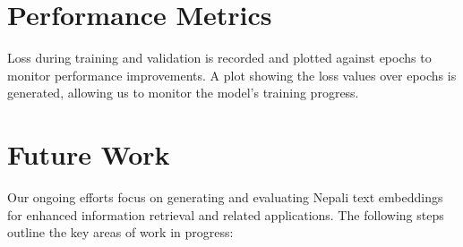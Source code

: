 \section{Performance Metrics}
Loss during training and validation is recorded and plotted against epochs to monitor performance improvements. A plot showing the loss values over epochs is generated, allowing us to monitor the model's training progress.
\begin{figure}[hbt!]
\end{figure}

\section{Future Work}

Our ongoing efforts focus on generating and evaluating Nepali text embeddings for enhanced information retrieval and related applications. The following steps outline the key areas of work in progress:

